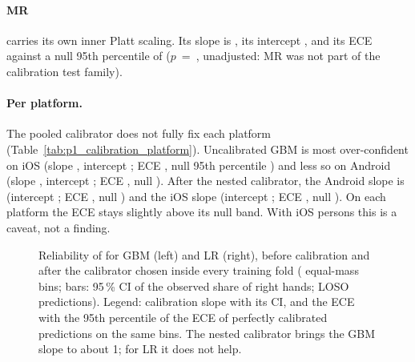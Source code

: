 \paragraph{MR} carries its own inner Platt scaling. Its slope is , its intercept
, and its ECE  against a null 95th percentile of 
($p$~=~, unadjusted: MR was not part of the calibration test family).

\paragraph{Per platform.} The pooled calibrator does not fully fix each platform
(Table~\ref{tab:p1_calibration_platform}). Uncalibrated GBM is most over-confident on iOS (slope
, intercept ; ECE
, null 95th percentile ) and less so on
Android (slope , intercept ; ECE
, null ). After the nested calibrator, the Android slope is
 (intercept ; ECE
, null ) and the iOS slope
 (intercept ; ECE
, null ). On each platform the ECE stays
slightly above its null band. With  iOS persons this is a caveat, not a finding.

\begin{figure}[htbp]
\centering
{}
\caption{Reliability of \pright{} for GBM (left) and LR (right), before calibration and after the
calibrator chosen inside every training fold ( equal-mass bins; bars: 95\,\% CI of the
observed share of right hands; LOSO predictions). Legend: calibration slope with its CI, and the ECE with
the 95th percentile of the ECE of perfectly calibrated predictions on the same bins. The nested
calibrator brings the GBM slope to about 1; for LR it does not help.}
\label{fig:P1_06_reliability}\label{fig:app:prep-reliability}
\end{figure}


